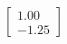\documentclass[preview]{standalone}
\begin{document}
\begin{align*}
\begin{bmatrix} 1.00 \\ -1.25 \end{bmatrix}
\end{align*}
\end{document}
